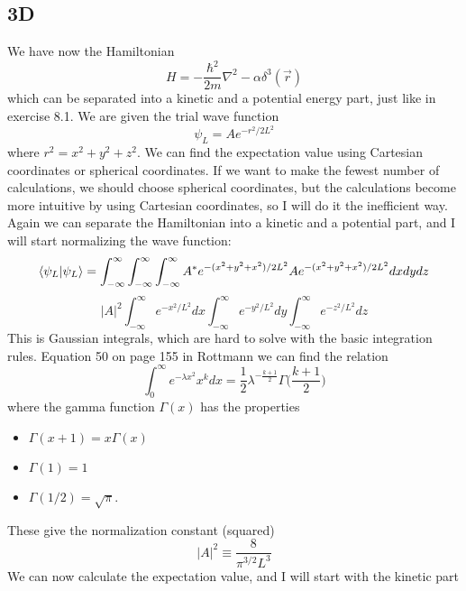 \documentclass{scrartcl}
\begin{document}
\subsection*{3D}
We have now the Hamiltonian
\begin{equation}
H=-\frac{\hbar^2}{2m}\nabla^2-\alpha\delta^3(\vec{r})
\end{equation}
which can be separated into a kinetic and a potential energy part, just like in exercise 8.1. We are given the trial wave function
\begin{equation}
\psi_L=Ae^{-r^2/2L^2}
\end{equation}
where $r^2=x^2+y^2+z^2$. We can find the expectation value using Cartesian coordinates or spherical coordinates. If we want to make the fewest number of calculations, we should choose spherical coordinates, but the calculations become more intuitive by using Cartesian coordinates, so I will do it the inefficient way.  Again we can separate the Hamiltonian into a kinetic and a potential part, and I will start normalizing the wave function:
\begin{equation*}
\braket{\psi_L}{\psi_L}=\int_{-\infty}^{\infty}\int_{-\infty}^{\infty}\int_{-\infty}^{\infty} A^*e^{-(x^2+y^2+x^2)/2L^2}Ae^{-(x^2+y^2+x^2)/2L^2}dxdydz
\end{equation*}
\begin{equation*}
|A|^2\int_{-\infty}^{\infty} e^{-x^2/L^2}dx\int_{-\infty}^{\infty} e^{-y^2/L^2} dy\int_{-\infty}^{\infty} e^{-z^2/L^2} dz
\end{equation*}
This is Gaussian integrals, which are hard to solve with the basic integration rules. Equation 50 on page 155 in Rottmann we can find the relation
\begin{equation}
\int_0^{\infty} e^{-\lambda x^2} x^k dx = \frac{1}{2}\lambda^{-\frac{k+1}{2}}\Gamma\bigg(\frac{k+1}{2}\bigg)
\label{eq:GoldenFormula}
\end{equation}
where the gamma function $\Gamma(x)$ has the properties
\begin{itemize}
\item $\Gamma(x+1)=x\Gamma(x)$
\item $\Gamma(1)=1$
\item $\Gamma(1/2)=\sqrt{\pi}$.
\end{itemize}
These give the normalization constant (squared)
\begin{equation}
|A|^2\equiv \frac{8}{\pi^{3/2}L^3}
\end{equation}
We can now calculate the expectation value, and I will start with the kinetic part
\end{document}

